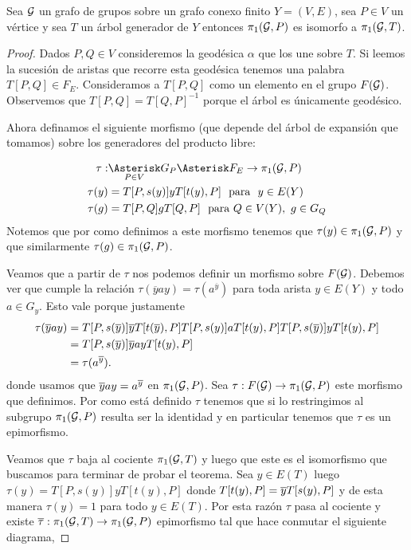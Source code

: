\documentclass[tesis.tex]{subfiles}
\begin{document}
\begin{teo}\label{teo_grp_fund_iso}
	Sea ${\cal G}$ un grafo de grupos sobre un grafo conexo finito $Y = (V,E)$, sea $P \in V$ un vértice y sea $T$ un árbol generador de $Y$ entonces $\pi_1({\cal G}, P)$ es isomorfo a $\pi_1({\cal G}, T)$.
\end{teo}
\begin{proof}
	Dados $P,Q \in V$ consideremos la geodésica $\alpha$ que los une sobre $T$.
	Si leemos la sucesión de aristas que recorre esta geodésica tenemos una palabra $T[P,Q] \in F_{E}$. 
	Consideramos a $T[P,Q]$ como un elemento en el grupo $F({\cal G})$.
	Observemos que $T[P,Q] = T[Q,P]^{-1}$ porque el árbol es únicamente geodésico.
	
	Ahora definamos el siguiente morfismo (que depende del árbol de expansión que tomamos) sobre los generadores del producto libre:
	
	\begin{align*}
		\tau: & \underset{P \in V}{\Asterisk} G_P \Asterisk F_{E} \to \pi_1(\cG,P)  \\
		 \tau(y) &= T[P,s(y)]yT[t(y),P] \ \ \text{para } \ y\in E(Y) \\
		\tau(g) &= T[P,Q] g T[Q,P] \ \  \text{para} \ Q \in V(Y), \ g \in G_Q
	\end{align*}
	Notemos que por como definimos a este morfismo tenemos que $\tau(y) \in \pi_1({\cal G},P)$ y que similarmente $\tau(g) \in \pi_1({\cal G},P)$.
	

	Veamos que a partir de $\tau$ nos podemos definir un morfismo sobre $F({\cal G})$.
	Debemos ver que cumple la relación $\tau(\overline y a y) = \tau (a^{\overline y})$ para toda arista $y \in E(Y)$ y todo $a \in G_y$.
	Esto vale porque justamente 
	\begin{align*}
		\tau(\overline y a y) & = T[P,s(\overline y)]\overline yT[t(\overline y),P] T[P,s(y)] a T[t(y),P] T[P,s(\overline y)]yT[t( y),P] \\
		& = T[P,s(\overline y)]  \overline y a y T[t( y),P] \\
		& = \tau (a^{\overline y}).
	\end{align*}
	donde usamos que $\overline y a y = a^{\overline y}$ en $\pi_1({\cal G},P)$.
	Sea $\tau: F({\cal G}) \to \pi_1({\cal G}, P)$ este morfismo que definimos.
	Por como está definido $\tau$ tenemos que si lo restringimos al subgrupo  $\pi_1({\cal G},P)$ resulta ser la identidad y en particular tenemos que $\tau$ es un epimorfismo.
	
	Veamos que $\tau$ baja al cociente $\pi_1({\cal G}, T)$ y luego que este es el isomorfismo que buscamos para terminar de probar el teorema.
	Sea $y \in E(T)$ luego $\tau(y) = T[P,s(y)]yT[t(y), P]$ donde $T[t(y), P] = \overline y T[s(y), P]$ y de esta manera $\tau(y) = 1$ para todo $y \in E(T)$.
	Por esta razón $\tau$ pasa al cociente y existe $\overline \tau: \pi_{1}({\cal G}, T) \to \pi_1 ({\cal G}, P)$ epimorfismo tal que hace conmutar el siguiente diagrama,
	

\end{proof}
\end{document}
